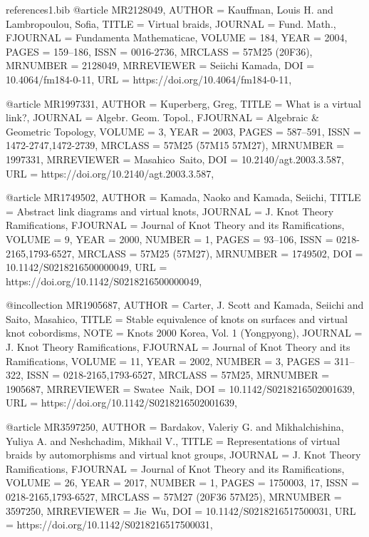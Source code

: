 \documentclass[11pt, reqno]{amsart}
\theoremstyle{definition}
\begin{document}
\begin{filecontents*}[overwrite]{references1.bib}
@article {MR2128049,
    AUTHOR = {Kauffman, Louis H. and Lambropoulou, Sofia},
     TITLE = {Virtual braids},
   JOURNAL = {Fund. Math.},
  FJOURNAL = {Fundamenta Mathematicae},
    VOLUME = {184},
      YEAR = {2004},
     PAGES = {159--186},
      ISSN = {0016-2736},
   MRCLASS = {57M25 (20F36)},
  MRNUMBER = {2128049},
MRREVIEWER = {Seiichi Kamada},
       DOI = {10.4064/fm184-0-11},
       URL = {https://doi.org/10.4064/fm184-0-11},
}


@article {MR1997331,
    AUTHOR = {Kuperberg, Greg},
     TITLE = {What is a virtual link?},
   JOURNAL = {Algebr. Geom. Topol.},
  FJOURNAL = {Algebraic \& Geometric Topology},
    VOLUME = {3},
      YEAR = {2003},
     PAGES = {587--591},
      ISSN = {1472-2747,1472-2739},
   MRCLASS = {57M25 (57M15 57M27)},
  MRNUMBER = {1997331},
MRREVIEWER = {Masahico\ Saito},
       DOI = {10.2140/agt.2003.3.587},
       URL = {https://doi.org/10.2140/agt.2003.3.587},
}

@article {MR1749502,
    AUTHOR = {Kamada, Naoko and Kamada, Seiichi},
     TITLE = {Abstract link diagrams and virtual knots},
   JOURNAL = {J. Knot Theory Ramifications},
  FJOURNAL = {Journal of Knot Theory and its Ramifications},
    VOLUME = {9},
      YEAR = {2000},
    NUMBER = {1},
     PAGES = {93--106},
      ISSN = {0218-2165,1793-6527},
   MRCLASS = {57M25 (57M27)},
  MRNUMBER = {1749502},
       DOI = {10.1142/S0218216500000049},
       URL = {https://doi.org/10.1142/S0218216500000049},
}

@incollection {MR1905687,
    AUTHOR = {Carter, J. Scott and Kamada, Seiichi and Saito, Masahico},
     TITLE = {Stable equivalence of knots on surfaces and virtual knot
              cobordisms},
      NOTE = {Knots 2000 Korea, Vol. 1 (Yongpyong)},
   JOURNAL = {J. Knot Theory Ramifications},
  FJOURNAL = {Journal of Knot Theory and its Ramifications},
    VOLUME = {11},
      YEAR = {2002},
    NUMBER = {3},
     PAGES = {311--322},
      ISSN = {0218-2165,1793-6527},
   MRCLASS = {57M25},
  MRNUMBER = {1905687},
MRREVIEWER = {Swatee\ Naik},
       DOI = {10.1142/S0218216502001639},
       URL = {https://doi.org/10.1142/S0218216502001639},
}



@article {MR3597250,
    AUTHOR = {Bardakov, Valeriy G. and Mikhalchishina, Yuliya A. and
              Neshchadim, Mikhail V.},
     TITLE = {Representations of virtual braids by automorphisms and virtual
              knot groups},
   JOURNAL = {J. Knot Theory Ramifications},
  FJOURNAL = {Journal of Knot Theory and its Ramifications},
    VOLUME = {26},
      YEAR = {2017},
    NUMBER = {1},
     PAGES = {1750003, 17},
      ISSN = {0218-2165,1793-6527},
   MRCLASS = {57M27 (20F36 57M25)},
  MRNUMBER = {3597250},
MRREVIEWER = {Jie\ Wu},
       DOI = {10.1142/S0218216517500031},
       URL = {https://doi.org/10.1142/S0218216517500031},
}


\end{filecontents*}
\end{document}
